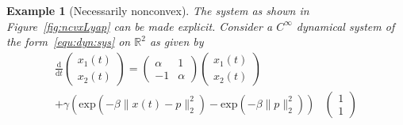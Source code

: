 \documentclass[letterpaper, 10 pt, conference]{ieeeconf}  %
\theoremstyle{mystyle}
\newtheorem{example}[theorem]{Example}
\begin{document}
\begin{example}[Necessarily nonconvex]
\label{ex:nec:ncvx}
The system as shown in Figure~\ref{fig:ncvxLyap} can be made explicit. Consider a $C^{\infty}$ dynamical system of the form~\eqref{equ:dyn:sys} on $\mathbb{R}^2$ as given by
\begin{equation}
\label{equ:nlin:ncvx}
\begin{aligned}
    \frac{\mathrm{d}}{\mathrm{d}t}\begin{pmatrix}
    x_1(t)\\ x_2(t)
\end{pmatrix} = \begin{pmatrix}
 \alpha & 1\\
    -1 & \alpha
\end{pmatrix}\begin{pmatrix} 
    x_1(t)\\ x_2(t)
\end{pmatrix}& \\
+  \gamma \left(\mathrm{exp}(-\beta \|x(t)-p\|_2^2 )-\mathrm{exp}(-\beta \|p\|_2^2 )\right)&\begin{pmatrix}
   1\\ 1
\end{pmatrix}
\end{aligned}
\end{equation}

\end{example}
\end{document}
